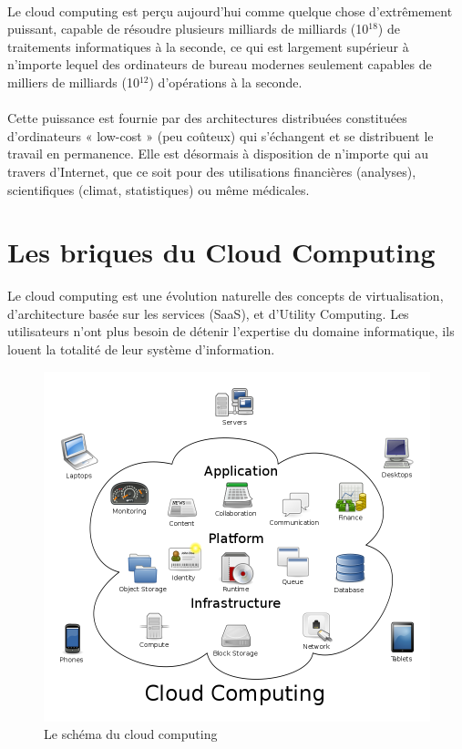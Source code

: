 \documentclass[a4paper,12pt]{report}
\begin{document}
\begin{onehalfspace}
	\paragraph*{}
	Le cloud computing est perçu aujourd'hui comme quelque chose d'extrêmement puissant, capable de résoudre plusieurs milliards de milliards (10$^{18}$) de traitements informatiques à la seconde, ce qui est largement supérieur à n'importe lequel des ordinateurs de bureau modernes seulement capables de milliers de milliards (10$^{12}$) d'opérations à la seconde.
	
	\paragraph*{}
	Cette puissance est fournie par des architectures distribuées constituées d'ordinateurs « low-cost » (peu coûteux) qui s'échangent et se distribuent le travail en permanence. Elle est désormais à disposition de n'importe qui au travers d'Internet, que ce soit pour des utilisations financières (analyses), scientifiques (climat, statistiques) ou même médicales.
	

	\section{Les briques du Cloud Computing}

	Le cloud computing est une évolution naturelle des concepts de virtualisation, d’architecture basée sur les services (SaaS), et d’Utility Computing. Les utilisateurs n’ont plus besoin de détenir l’expertise du domaine informatique, ils louent la totalité de leur système d’information.
	
	\begin{figure}[!h]
		\centering
		\includegraphics[width=15cm]{schema_structure.png}
		\caption{Le schéma du cloud computing}
	\end{figure}
	

\end{onehalfspace}
\end{document}
